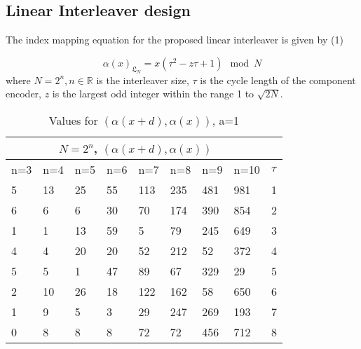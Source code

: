 \documentclass[20 pts]{article}
\begin{document}
\subsection{Linear Interleaver design}
The index mapping equation for the proposed linear interleaver is given by (1)

\begin{equation}
\alpha(x)_{\mathfrak{L}_N}=x(\tau^2 - z\tau + 1) \mod N
\end{equation}
where 
$N = 2^n, n\in \mathbb{R}$ is the interleaver size, $\tau$ is the cycle length of the component encoder, $z$ is the largest odd integer within the range 1 to $\sqrt{2N}$.
\begin{table}[h!]
\centering
\begin{tabular}{ |p{0.7cm}|p{0.7cm}|p{0.7cm}|p{0.7cm}|p{0.7cm}|p{0.7cm}|p{0.7cm} |p{0.7cm}||p{0.7cm} |}
 \hline
 \multicolumn{8}{|c|}{$N=2^n$, $(\alpha(x+d),\alpha(x))$} \\
 \hline
n=3&n=4&n=5&n=6&n=7&n=8&n=9&n=10&$\tau$\\
 \hline
  5   & 13  &  25   & 55  & 113 &  235  & 481&981&1\\
  6  &   6  &   6  &  30 &   70 &  174 &  390 &854&2\\
  1 &    1 &   13&    59 &    5  &  79 &  245 &649&3\\
 4  &   4 &   20 &   20 &   52 &  212 &   52 & 372&4\\
5  &   5 &    1 &   47 &   89  &  67 &  329 & 29&5\\
 2  &  10  &  26  &  18 &  122  & 162 &   58 &650&6\\
1   &  9  &   5   &  3 &   29 &  247 &  269 &193&7\\
0   &  8   &  8  &   8  &  72  &  72 &  456  &712&8\\

 \hline
\end{tabular}
\caption{Values for $(\alpha(x+d),\alpha(x))$, a=1}
\label{table:1}
\end{table}
\end{document}
